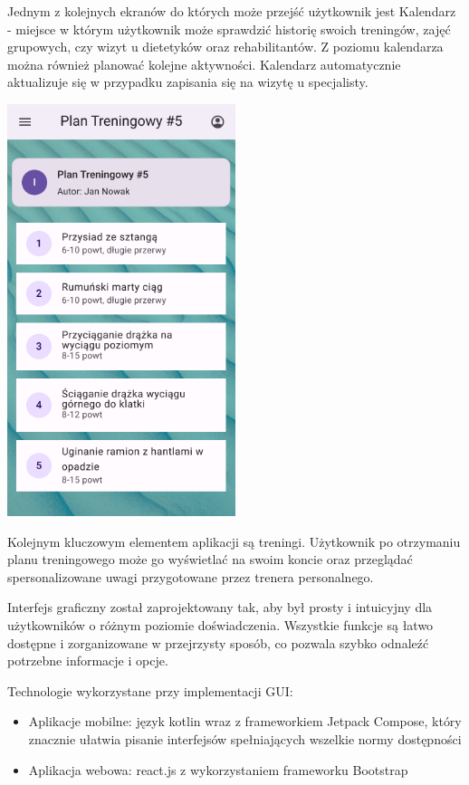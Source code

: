 {Jednym z kolejnych ekranów do których może przejść użytkownik jest Kalendarz - miejsce w którym użytkownik może sprawdzić historię swoich treningów, zajęć grupowych, czy wizyt u dietetyków oraz rehabilitantów. Z poziomu kalendarza można również planować kolejne aktywności. Kalendarz automatycznie aktualizuje się w przypadku zapisania się na wizytę u specjalisty.}

\includegraphics[width=0.5\textwidth]{latex/gui/training.png}

{Kolejnym kluczowym elementem aplikacji są treningi. Użytkownik po otrzymaniu planu treningowego może go wyświetlać na swoim koncie oraz przeglądać spersonalizowane uwagi przygotowane przez trenera personalnego.}

{Interfejs graficzny został zaprojektowany tak, aby był prosty i intuicyjny dla użytkowników o różnym poziomie doświadczenia. Wszystkie funkcje są łatwo dostępne i zorganizowane w przejrzysty sposób, co pozwala szybko odnaleźć potrzebne informacje i opcje.}

{Technologie wykorzystane przy implementacji GUI:
\begin{itemize}
    \item Aplikacje mobilne: język kotlin wraz z frameworkiem Jetpack Compose, który znacznie ułatwia pisanie interfejsów spełniających wszelkie normy dostępności
    \item Aplikacja webowa: react.js z wykorzystaniem frameworku Bootstrap
\end{itemize}
}
